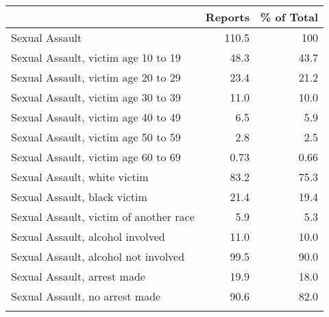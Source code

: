 {
\def\sym#1{\ifmmode^{#1}\else\(^{#1}\)\fi}
\begin{tabular}{l r r}
\hline\hline
& Reports & \% of Total\\
\hline
Sexual Assault  &  110.5 & 100 \\
Sexual Assault, victim age 10 to 19 & 48.3 & 43.7 \\
Sexual Assault, victim age 20 to 29 & 23.4 & 21.2 \\
Sexual Assault, victim age 30 to 39 & 11.0 & 10.0 \\
Sexual Assault, victim age 40 to 49 & 6.5 & 5.9 \\
Sexual Assault, victim age 50 to 59 & 2.8 & 2.5 \\
Sexual Assault, victim age 60 to 69 & 0.73 & 0.66 \\
Sexual Assault, white victim & 83.2 & 75.3 \\
Sexual Assault, black victim & 21.4 & 19.4 \\
Sexual Assault, victim of another race & 5.9 & 5.3 \\
Sexual Assault, alcohol involved & 11.0 & 10.0 \\
Sexual Assault, alcohol not involved & 99.5 & 90.0 \\
Sexual Assault, arrest made & 19.9 & 18.0 \\
Sexual Assault, no arrest made & 90.6 & 82.0 \\
\hline\hline \\
\end{tabular}
}
